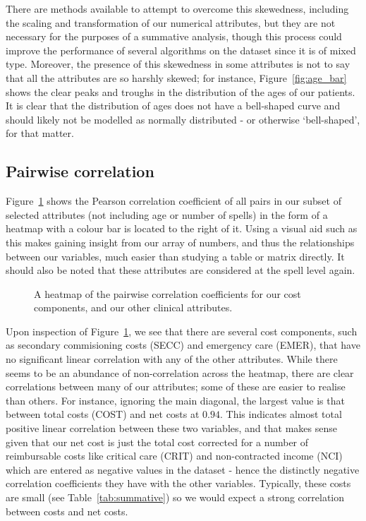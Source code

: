 There are methods available to attempt to overcome this skewedness, including
the scaling and transformation of our numerical attributes, but they are not
necessary for the purposes of a summative analysis, though this process could
improve the performance of several algorithms on the dataset since it is of
mixed type. Moreover, the presence of this skewedness in some attributes is not
to say that all the attributes are so harshly skewed; for instance,
Figure~\ref{fig:age_bar} shows the clear peaks and troughs in the distribution
of the ages of our patients. It is clear that the distribution of ages does not
have a bell-shaped curve and should likely not be modelled as normally
distributed \-- or otherwise `bell-shaped', for that matter.

\subsection{Pairwise correlation}\label{subsec:corr}

Figure~\ref{fig:corr_heatmap} shows the Pearson correlation coefficient of all
pairs in our subset of selected attributes (not including age or number of
spells) in the form of a heatmap with a colour bar is located to the right of
it. Using a visual aid such as this makes gaining insight from our array of
numbers, and thus the relationships between our variables, much easier than
studying a table or matrix directly. It should also be noted that these
attributes are considered at the spell level again.

\begin{figure}[htbp]
    \caption{A heatmap of the pairwise correlation coefficients for our cost
    components, and our other clinical attributes.}\label{fig:corr_heatmap}
\end{figure}

Upon inspection of Figure~\ref{fig:corr_heatmap}, we see that there are several
cost components, such as secondary commisioning costs (SECC) and emergency care
(EMER), that have no significant linear correlation with any of the other
attributes. While there seems to be an abundance of non-correlation across the
heatmap, there are clear correlations between many of our attributes; some of
these are easier to realise than others. For instance, ignoring the main
diagonal, the largest value is that between total costs (COST) and net costs at
\(0.94\). This indicates almost total positive linear correlation between these
two variables, and that makes sense given that our net cost is just the total
cost corrected for a number of reimbursable costs like critical care (CRIT)
and non-contracted income (NCI) which are entered as negative values in the
dataset \-- hence the distinctly negative correlation coefficients they have
with the other variables. Typically, these costs are small (see
Table~\ref{tab:summative}) so we would expect a strong correlation between costs
and net costs.


